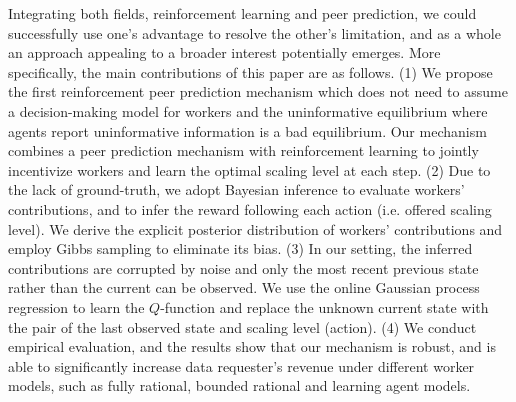 \documentclass[letterpaper]{article} %
\begin{document}
Integrating both fields, reinforcement learning and peer prediction, we could successfully use one's advantage to resolve the other's limitation, and as a whole an approach appealing to a broader interest potentially emerges. More specifically,  the main contributions of this paper are as follows.
(1) We propose the first reinforcement peer prediction mechanism which does not need to assume a decision-making model for workers and the uninformative equilibrium where agents report uninformative information is a bad equilibrium.
Our mechanism combines a peer prediction mechanism with reinforcement learning to jointly incentivize workers and learn the optimal scaling level at each step.
(2) Due to the lack of ground-truth, we adopt Bayesian inference to evaluate workers' contributions, and to infer the reward following each action (i.e. offered scaling level). We derive the explicit posterior distribution of workers' contributions and employ Gibbs sampling to eliminate its bias.
(3) In our setting, the inferred contributions are corrupted by noise and only the most recent previous state rather than the current can be observed. We use the online Gaussian process regression to learn the $Q$-function and replace the unknown current state with the pair of the last observed state and scaling level (action).
(4) We conduct empirical evaluation, and the results show that our mechanism is robust, and is able to significantly increase data requester's revenue under different worker models, such as fully rational, bounded rational and learning agent models.
\end{document}
